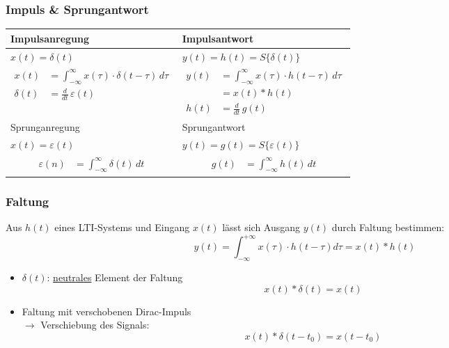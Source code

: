 \subsubsection{Impuls \& Sprungantwort}
\small
\begin{centering}
	\setlength{\abovedisplayskip}{-10pt}
	\setlength{\belowdisplayskip}{-5pt}
	\begin{tabularx}{\columnwidth}{|X|X|}
		\hline
		Impulsanregung & Impulsantwort\\
		\hline
		$x(t)=\delta(t)$ & $y(t)= h(t) = S\{ \delta(t) \}$ \\
		\hline
		{
			\begin{align*}
				x(t) &= \int_{-\infty}^{\infty}x(\tau) \cdot \delta(t-\tau) \, d\tau\\
				\delta(t) &= \frac{d}{dt} \, \varepsilon(t)
			\end{align*}
		}	 &
		{
			\begin{align*}	
				y(t) &= \int_{-\infty}^{\infty}x(\tau) \cdot h(t-\tau) \, d\tau\\
				&= x(t) * h(t)\\
				h(t) &= \frac{d}{dt} \, g(t)
			\end{align*}
		}	\\
		\hline\hline
		Sprunganregung & Sprungantwort \\
		\hline
		$x(t)=\varepsilon(t)$ & $y(t)= g(t) = S\{ \varepsilon(t) \}$ \\
		\hline
		{
			\begin{align*}	
				\varepsilon(n) &= \int_{-\infty}^{\infty} \delta(t) \, dt
			\end{align*}
		} &
		{
			\begin{align*}	
			g(t) &= \int_{-\infty}^{\infty} h(t) \, dt
			\end{align*}
		}\\
		\hline
	\end{tabularx}
\end{centering}
\normalsize
\subsubsection{Faltung}
\small
Aus $h(t)$ eines LTI-Systems und Eingang $x(t)$ lässt sich
Ausgang $y(t)$ durch Faltung bestimmen:
\normalsize
  \[
      y(t) = \int_{-\infty}^{+\infty} x(\tau)\cdot h(t-\tau)d\tau = \boxed{x(t)*h(t)}
  \]
  \begin{itemize}
  	  \item $\delta(t)$: \underline{neutrales} Element der Faltung
  	  \[
  	  x(t)* \delta(t) = x(t)
  	  \]
  	\item Faltung mit verschobenen Dirac-Impuls \\$\rightarrow$ Verschiebung des Signals:
  	\[
  	x(t)* \delta(t - t_0) = x(t - t_0)
  	\]
  \end{itemize}

